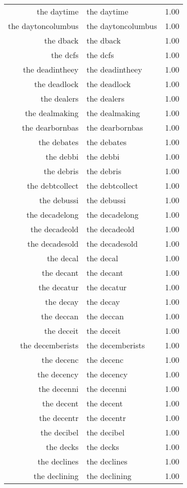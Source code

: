 \begin{table}[ht]
\begin{tabular}{rlr}
  the daytime & the daytime & 1.00 \\ 
  the daytoncolumbus & the daytoncolumbus & 1.00 \\ 
  the dback & the dback & 1.00 \\ 
  the dcfs & the dcfs & 1.00 \\ 
  the deadintheey & the deadintheey & 1.00 \\ 
  the deadlock & the deadlock & 1.00 \\ 
  the dealers & the dealers & 1.00 \\ 
  the dealmaking & the dealmaking & 1.00 \\ 
  the dearbornbas & the dearbornbas & 1.00 \\ 
  the debates & the debates & 1.00 \\ 
  the debbi & the debbi & 1.00 \\ 
  the debris & the debris & 1.00 \\ 
  the debtcollect & the debtcollect & 1.00 \\ 
  the debussi & the debussi & 1.00 \\ 
  the decadelong & the decadelong & 1.00 \\ 
  the decadeold & the decadeold & 1.00 \\ 
  the decadesold & the decadesold & 1.00 \\ 
  the decal & the decal & 1.00 \\ 
  the decant & the decant & 1.00 \\ 
  the decatur & the decatur & 1.00 \\ 
  the decay & the decay & 1.00 \\ 
  the deccan & the deccan & 1.00 \\ 
  the deceit & the deceit & 1.00 \\ 
  the decemberists & the decemberists & 1.00 \\ 
  the decenc & the decenc & 1.00 \\ 
  the decency & the decency & 1.00 \\ 
  the decenni & the decenni & 1.00 \\ 
  the decent & the decent & 1.00 \\ 
  the decentr & the decentr & 1.00 \\ 
  the decibel & the decibel & 1.00 \\ 
  the decks & the decks & 1.00 \\ 
  the declines & the declines & 1.00 \\ 
  the declining & the declining & 1.00 \\ 

\end{tabular}
\end{table}

